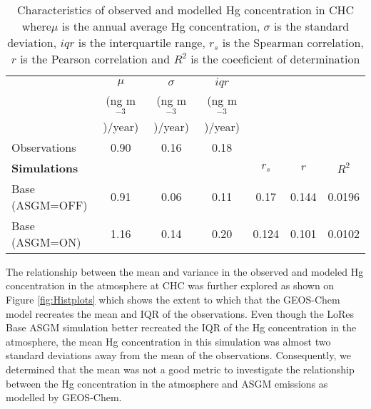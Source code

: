 \begin{table}[H]
  \begin{center}
    \caption{Characteristics of observed and modelled Hg concentration in CHC where$\mu$ is the annual average Hg concentration, $\sigma$ is the standard deviation, $iqr$ is the interquartile range, $r_s$ is the Spearman correlation, $r$ is the Pearson correlation and $R^2$ is the coeeficient of determination}
    \label{tab:ModelvsObsStats}
    \begin{tabular}{lcccccc}
      
                          & $\mu$                 & $\sigma$            & $iqr$               & & & \\
                          &  (ng m$^{-3}$)/year)  & (ng m$^{-3}$)/year) & (ng m$^{-3}$)/year) & & & \\
     \cmidrule{2-4}
     Observations         & 0.90             & 0.16            & 0.18        &  & & \\
     \textbf{Simulations} &                  &                  &               &\textbf{$r_s$} &\textbf{$r$} &\textbf{$R^2$}\\ %
      \hline
      Base (ASGM=OFF)     & 0.91             & 0.06            & 0.11         & 0.17         & 0.144      & 0.0196\\ 
      Base (ASGM=ON)      & 1.16            & 0.14            & 0.20        & 0.124         & 0.101       & 0.0102\\ %
    \end{tabular}
  \end{center}
\end{table}
\FloatBarrier

\begin{flushleft}
The relationship between the mean and variance in the observed and modeled Hg concentration in the atmosphere at CHC was further explored as shown on Figure \ref{fig:Histplots} which shows the extent to which that the GEOS-Chem model recreates the mean and IQR of the observations. Even though the LoRes Base ASGM simulation better recreated the IQR of the Hg concentration in the atmosphere, the mean Hg concentration in this simulation was almost two standard deviations away from the mean of the observations. Consequently, we determined that the mean was not a good metric to investigate the relationship between the Hg concentration in the atmosphere and ASGM emissions as modelled by GEOS-Chem. 
\end{flushleft}



